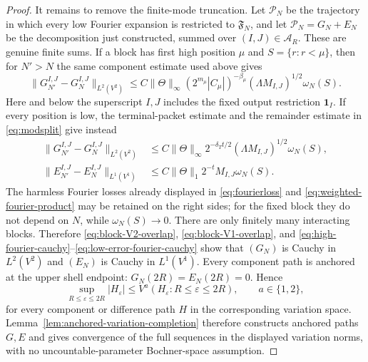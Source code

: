 \documentclass[11pt]{article}
\numberwithin{equation}{section}
\theoremstyle{remark}
\theoremstyle{definition}
\newcommand{\norm}[1]{\lVert #1\rVert}
\begin{document}
\begin{proof}
It remains to remove the finite-mode truncation.  Let $\mathcal P_N$ be
the trajectory in which every low Fourier expansion is restricted to
$\mathfrak F_N$, and let
$\mathcal P_N=G_N+E_N$ be the decomposition just constructed, summed over
$(I,J)\in\mathcal A_R$.  These are genuine finite sums.  If a block has
first high position $\mu$ and $S=\{r:r<\mu\}$, then for $N'>N$ the same
component estimate used above gives
\begin{equation}\label{eq:high-fourier-cauchy}
 \norm{G_{N'}^{I,J}-G_N^{I,J}}_{L^2(V^2)}
 \le C\norm\Theta_\infty
 (2^{m_\mu}|C_\mu|)^{-\beta_\mu}
 (\Lambda M_{I,J})^{1/2}
 \omega_N(S).
\end{equation}
Here and below the superscript $I,J$ includes the fixed output restriction
$\mathbf1_I$.  If every position is low, the terminal-packet estimate and
the remainder estimate in \eqref{eq:modsplit} give instead
\begin{align}
 \norm{G_{N'}^{I,J}-G_N^{I,J}}_{L^2(V^2)}
 &\le C\norm\Theta_\infty 2^{-\delta_Tt/2}
       (\Lambda M_{I,J})^{1/2}\omega_N(S),
 \label{eq:low-good-fourier-cauchy}\\
 \norm{E_{N'}^{I,J}-E_N^{I,J}}_{L^1(V^1)}
 &\le C\norm\Theta_1 2^{-t}M_{I,J}\omega_N(S).
 \label{eq:low-error-fourier-cauchy}
\end{align}
The harmless Fourier losses already displayed in
\eqref{eq:fourierloss} and \eqref{eq:weighted-fourier-product} may be
retained on the right sides; for the fixed block they do not depend on
$N$, while $\omega_N(S)\to0$.  There are only finitely many interacting
blocks.  Therefore \eqref{eq:block-V2-overlap},
\eqref{eq:block-V1-overlap}, and
\eqref{eq:high-fourier-cauchy}--\eqref{eq:low-error-fourier-cauchy} show
that $(G_N)$ is Cauchy in $L^2(V^2)$ and $(E_N)$ is Cauchy in
$L^1(V^1)$.  Every component path is anchored at the upper shell
endpoint: $G_N(2R)=E_N(2R)=0$.  Hence
\[
 \sup_{R\le\varepsilon\le2R}|H_\varepsilon|
 \le V^a(H_\varepsilon:R\le\varepsilon\le2R),
 \qquad a\in\{1,2\},
\]
for every component or difference path $H$ in the corresponding variation
space.  Lemma~\ref{lem:anchored-variation-completion} therefore constructs
anchored paths $G,E$ and gives convergence of the full sequences in the
displayed variation norms, with no uncountable-parameter Bochner-space
assumption.


\end{proof}
\end{document}
